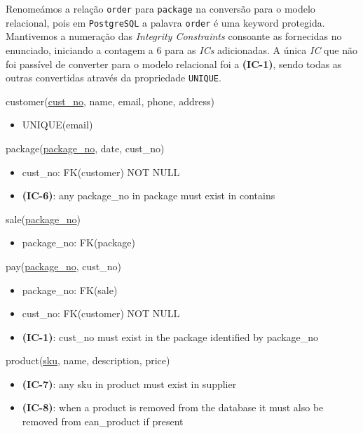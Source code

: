 \documentclass[12pt,a4paper]{article}
\begin{document}
  Renomeámos a relação \texttt{order} para \texttt{package} na conversão para o modelo relacional, pois em \texttt{PostgreSQL} a palavra \texttt{order} é uma keyword protegida.
  Mantivemos a numeração das \textit{Integrity Constraints} consoante as fornecidas no enunciado, iniciando a contagem a 6 para as \textit{ICs} adicionadas.
  A única \textit{IC} que não foi passível de converter para o modelo relacional foi a \textbf{(IC-1)}, sendo todas as outras convertidas através da propriedade \texttt{UNIQUE}.

  \ttfamily
  \vspace*{10pt}
  \noindent
  customer(\underline{cust\_no}, name, email, phone, address)
  \begin{itemize}[nosep]
      \item UNIQUE(email)
  \end{itemize}

  \vspace*{10pt}
  \noindent
  package(\underline{package\_no}, date, cust\_no)
  \begin{itemize}[nosep]
      \item cust\_no: FK(customer) NOT NULL
      \item \textsf{\textbf{(IC-6)}}: any package\_no in package \textsf{must exist} in contains
  \end{itemize}

  \vspace*{10pt}
  \noindent
  sale(\underline{package\_no})
  \begin{itemize}[nosep]
      \item package\_no: FK(package)
  \end{itemize}

  \vspace*{10pt}
  \noindent
  pay(\underline{package\_no}, cust\_no)
  \begin{itemize}[nosep]
      \item package\_no: FK(sale)
      \item cust\_no: FK(customer) NOT NULL
      \item \textsf{\textbf{(IC-1)}}: cust\_no \textsf{must exist} in the package identified by package\_no
  \end{itemize}

  \vspace*{10pt}
  \noindent
  product(\underline{sku}, name, description, price)
  \begin{itemize}[nosep]
      \item \textsf{\textbf{(IC-7)}}: any sku in product \textsf{must exist} in supplier
      \item \textsf{\textbf{(IC-8)}}: when a product \textsf{is removed} from the database it \textsf{must also} be removed from ean\_product if present
  \end{itemize}
\end{document}
